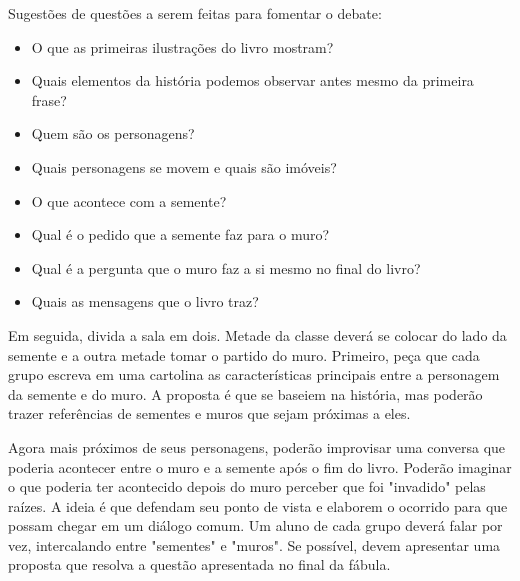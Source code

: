 \documentclass[11pt]{extarticle}
\begin{document}

Sugestões de questões a serem feitas para fomentar o debate:

\begin{itemize}

\item O que as primeiras ilustrações do livro mostram?

\item Quais elementos da história podemos observar antes mesmo da primeira frase?

\item Quem são os personagens?

\item Quais personagens se movem e quais são imóveis?

\item O que acontece com a semente?

\item Qual é o pedido que a semente faz para o muro?

\item Qual é a pergunta que o muro faz a si mesmo no final do livro?

\item Quais as mensagens que o livro traz?

\end{itemize}

Em seguida, divida a sala em dois. Metade da classe deverá se colocar do lado da semente e a outra metade tomar o partido do muro. Primeiro, peça que cada grupo escreva em uma cartolina as características principais entre a personagem da semente e do muro. A proposta é que se baseiem na história, mas poderão trazer referências de sementes e muros que sejam próximas a eles.



Agora mais próximos de seus personagens, poderão improvisar uma conversa que poderia acontecer entre o muro e a semente após o fim do livro. Poderão imaginar o que poderia ter acontecido depois do muro perceber que foi "invadido" pelas raízes. A ideia é que defendam seu ponto de vista e elaborem o ocorrido para que possam chegar em um diálogo comum. Um aluno de cada grupo deverá falar por vez, intercalando entre "sementes" e "muros". Se possível, devem apresentar uma proposta que resolva a questão apresentada no final da fábula.
\end{document}
